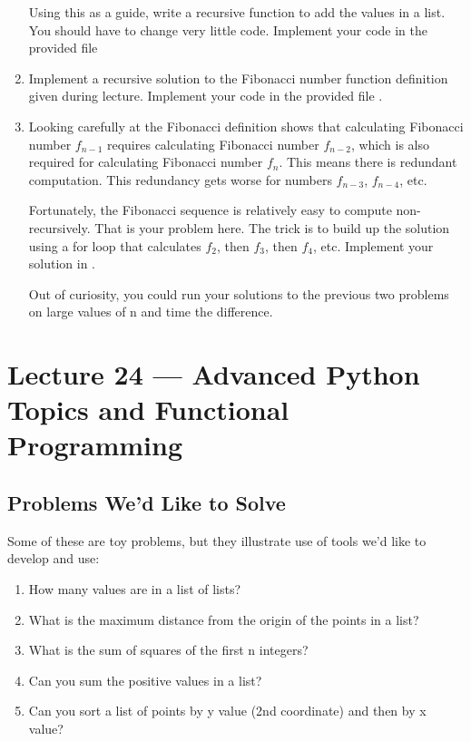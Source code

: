\documentclass[letterpaper,10pt,english]{sphinxmanual}
\begin{document}
\begin{enumerate}
Using this as a guide, write a recursive function to add the values
in a list.  You should have to change very little code.  Implement
your code in the provided file 

\item {} 
Implement a recursive solution to the Fibonacci number function
definition given during lecture.  Implement your code in the
provided file .

\item {} 
Looking carefully at the Fibonacci definition shows that
calculating Fibonacci number \(f_{n-1}\) requires calculating Fibonacci
number \(f_{n-2}\), which is also required for calculating Fibonacci number
\(f_n\).  This means there is redundant computation.  This redundancy gets
worse for numbers \(f_{n-3}\), \(f_{n-4}\), etc.

Fortunately, the Fibonacci sequence is relatively easy to compute
non-recursively.  That is your problem here.  The trick is to build
up the solution using a for loop that calculates \(f_2\), then \(f_3\),
then \(f_4\), etc. Implement your solution in .

Out of curiosity, you could run your solutions to the previous two
problems on large values of n and time the difference.

\end{enumerate}


\chapter{Lecture 24 — Advanced Python Topics and Functional Programming}
\label{\detokenize{lecture_notes/lec24_functional:lecture-24-advanced-python-topics-and-functional-programming}}\label{\detokenize{lecture_notes/lec24_functional::doc}}

\section{Problems We’d Like to Solve}
\label{\detokenize{lecture_notes/lec24_functional:problems-we-d-like-to-solve}}
Some of these are toy problems, but they illustrate use of tools we’d
like to develop and use:
\begin{enumerate}
\item {} 
How many values are in a list of lists?

\item {} 
What is the maximum distance from the origin of the points in a list?

\item {} 
What is the sum of squares of the first n integers?

\item {} 
Can you sum the positive values in a list?

\item {} 
Can you sort a list of points by y value (2nd coordinate) and then
by x value?

\end{enumerate}
\end{document}
